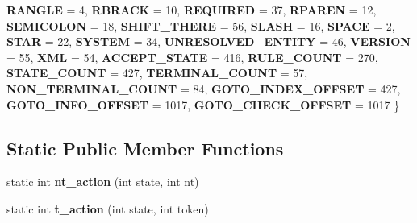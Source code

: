\begin{DoxyCompactItemize}
{\bfseries R\+A\+N\+G\+LE} = 4, 
{\bfseries R\+B\+R\+A\+CK} = 10, 
{\bfseries R\+E\+Q\+U\+I\+R\+ED} = 37, 
{\bfseries R\+P\+A\+R\+EN} = 12, 
\newline
{\bfseries S\+E\+M\+I\+C\+O\+L\+ON} = 18, 
{\bfseries S\+H\+I\+F\+T\+\_\+\+T\+H\+E\+RE} = 56, 
{\bfseries S\+L\+A\+SH} = 16, 
{\bfseries S\+P\+A\+CE} = 2, 
\newline
{\bfseries S\+T\+AR} = 22, 
{\bfseries S\+Y\+S\+T\+EM} = 34, 
{\bfseries U\+N\+R\+E\+S\+O\+L\+V\+E\+D\+\_\+\+E\+N\+T\+I\+TY} = 46, 
{\bfseries V\+E\+R\+S\+I\+ON} = 55, 
\newline
{\bfseries X\+ML} = 54, 
{\bfseries A\+C\+C\+E\+P\+T\+\_\+\+S\+T\+A\+TE} = 416, 
{\bfseries R\+U\+L\+E\+\_\+\+C\+O\+U\+NT} = 270, 
{\bfseries S\+T\+A\+T\+E\+\_\+\+C\+O\+U\+NT} = 427, 
\newline
{\bfseries T\+E\+R\+M\+I\+N\+A\+L\+\_\+\+C\+O\+U\+NT} = 57, 
{\bfseries N\+O\+N\+\_\+\+T\+E\+R\+M\+I\+N\+A\+L\+\_\+\+C\+O\+U\+NT} = 84, 
{\bfseries G\+O\+T\+O\+\_\+\+I\+N\+D\+E\+X\+\_\+\+O\+F\+F\+S\+ET} = 427, 
{\bfseries G\+O\+T\+O\+\_\+\+I\+N\+F\+O\+\_\+\+O\+F\+F\+S\+ET} = 1017, 
\newline
{\bfseries G\+O\+T\+O\+\_\+\+C\+H\+E\+C\+K\+\_\+\+O\+F\+F\+S\+ET} = 1017
 \}
\end{DoxyCompactItemize}
\subsection*{Static Public Member Functions}
\begin{DoxyCompactItemize}
\item 
\mbox{\label{class_xml_stream_reader___table_aaa778f5103c0f774d6288d1657e73e6e}} 
static int {\bfseries nt\+\_\+action} (int state, int nt)
\item 
\mbox{\label{class_xml_stream_reader___table_a18887b77eee3160e09fd1b15293a1671}} 
static int {\bfseries t\+\_\+action} (int state, int token)
\end{DoxyCompactItemize}
